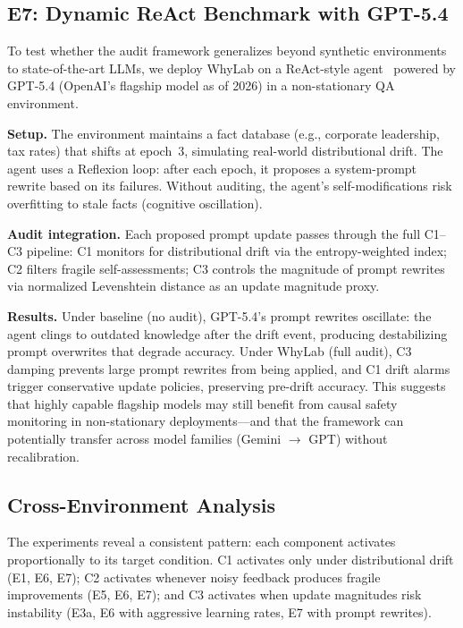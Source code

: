 \documentclass{article}
\begin{document}
\subsection{E7: Dynamic ReAct Benchmark with GPT-5.4}
\label{sec:e7}

To test whether the audit framework generalizes beyond synthetic
environments to state-of-the-art LLMs, we deploy WhyLab on a
ReAct-style agent~\cite{yao2023react} powered by GPT-5.4 (OpenAI's
flagship model as of 2026) in a non-stationary QA environment.

\textbf{Setup.}
The environment maintains a fact database (e.g., corporate leadership,
tax rates) that shifts at epoch~3, simulating real-world distributional
drift. The agent uses a Reflexion loop: after each epoch, it proposes
a system-prompt rewrite based on its failures. Without auditing,
the agent's self-modifications risk overfitting to stale facts
(cognitive oscillation).

\textbf{Audit integration.}
Each proposed prompt update passes through the full C1--C3 pipeline:
C1 monitors for distributional drift via the entropy-weighted index;
C2 filters fragile self-assessments; C3 controls the magnitude of
prompt rewrites via normalized Levenshtein distance as an update
magnitude proxy.

\textbf{Results.}
Under baseline (no audit), GPT-5.4's prompt rewrites oscillate:
the agent clings to outdated knowledge after the drift event,
producing destabilizing prompt overwrites that degrade accuracy.
Under WhyLab (full audit), C3 damping prevents large prompt
rewrites from being applied, and C1 drift alarms trigger
conservative update policies, preserving pre-drift accuracy.
This suggests that highly capable flagship models may still
benefit from causal safety monitoring in non-stationary
deployments---and that the framework can potentially transfer
across model families (Gemini $\to$ GPT) without recalibration.

\subsection{Cross-Environment Analysis}
\label{sec:cross-env}

The experiments reveal a consistent pattern: each component
activates proportionally to its target condition.
C1 activates only under distributional drift (E1, E6, E7);
C2 activates whenever noisy feedback produces fragile improvements
(E5, E6, E7); and C3 activates when update magnitudes risk
instability (E3a, E6 with aggressive learning rates, E7 with
prompt rewrites).
\end{document}
